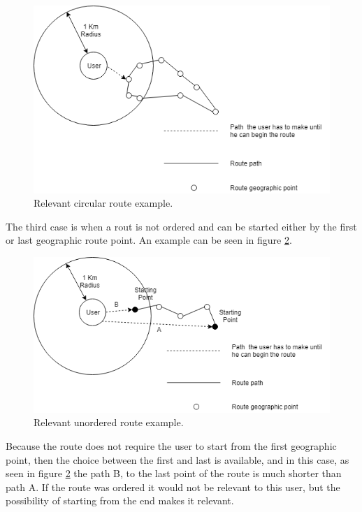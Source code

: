     \begin{figure}[H]            
        \includegraphics[width=\textwidth]{images/project-structure/circular-example.PNG}
        \caption{Relevant circular route example.}
        \label{fig:circularexample} 
    \end{figure}   

    The third case is when a rout is not ordered and can be started either by the first or last geographic route point. An example can be seen in figure \ref{fig:unorderedexample}.
    \begin{figure}[H]            
        \includegraphics[width=\textwidth]{images/project-structure/unordered-example.PNG}
        \caption{Relevant unordered route example.}
        \label{fig:unorderedexample} 
    \end{figure}   
    Because the route does not require the user to start from the first geographic point, then the choice between the first and last is available, 
    and in this case, as seen in figure \ref{fig:unorderedexample} the path B, to the last point of the route is much shorter than path A. If the route was ordered
    it would not be relevant to this user, but the possibility of starting from the end makes it relevant.

